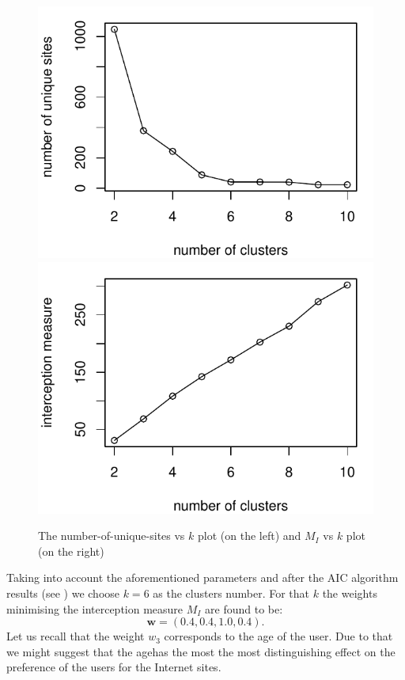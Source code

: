 \documentclass[runningheads,a4paper]{llncs}
\begin{document}
\begin{figure}

\includegraphics[scale=0.6]{fig_uurls.pdf}\hfill
\includegraphics[scale=0.6]{fig_meas.pdf}

\caption{The number-of-unique-sites vs $k$ plot (on the left) and $M_I$ vs $k$ plot (on the right)}
\label{N7Jti}
\end{figure}

Taking into account the aforementioned parameters and after the AIC algorithm results (see \cite{aic}) we choose $k=6$ as the clusters number. For that $k$ the weights minimising the interception measure $M_I$ are found to be:
\[
	\boldsymbol{w} = (0.4, 0.4, 1.0, 0.4).
\]
Let us recall that the weight $w_3$ corresponds to the age of the user. Due to that we might suggest that the agehas the most the most distinguishing effect on the preference of the users for the Internet sites.
\end{document}
